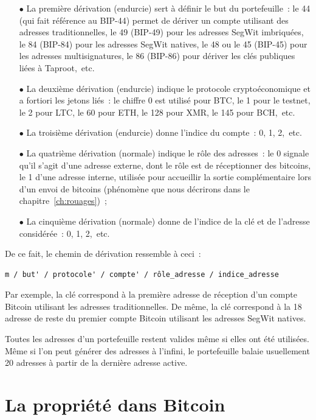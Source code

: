\begin{itemize}
  \item[$\bullet$] La première dérivation (endurcie) sert à définir le but du portefeuille~: le 44 (qui fait référence au BIP-44) permet de dériver un compte utilisant des adresses traditionnelles, le 49 (BIP-49) pour les adresses SegWit imbriquées, le 84 (BIP-84) pour les adresses SegWit natives, le 48 ou le 45 (BIP-45) pour les adresses multisignatures, le 86 (BIP-86) pour dériver les clés publiques liées à Taproot,~etc.
  \item[$\bullet$] La deuxième dérivation (endurcie) indique le protocole cryptoéconomique et a fortiori les jetons liés~: le chiffre 0 est utilisé pour BTC, le 1 pour le testnet, le 2 pour LTC, le 60 pour ETH, le 128 pour XMR, le 145 pour BCH,~etc.
  \item[$\bullet$] La troisième dérivation (endurcie) donne l'indice du compte~: 0, 1, 2,~etc.
  \item[$\bullet$] La quatrième dérivation (normale) indique le rôle des adresses~: le 0 signale qu'il s'agit d'une adresse externe, dont le rôle est de réceptionner des bitcoins, le 1 d'une adresse interne, utilisée pour accueillir la sortie complémentaire lors d'un envoi de bitcoins (phénomène que nous décrirons dans le chapitre~\ref{ch:rouages})~;
  \item[$\bullet$] La cinquième dérivation (normale) donne de l'indice de la clé et de l'adresse considérée~: 0, 1, 2,~etc.
\end{itemize}

De ce fait, le chemin de dérivation ressemble à ceci~:

\begin{Verbatim}[fontsize=\footnotesize]
m / but' / protocole' / compte' / rôle_adresse / indice_adresse
\end{Verbatim}

Par exemple, la clé  correspond à la première adresse de réception d'un compte Bitcoin utilisant les adresses traditionnelles. De même, la clé  correspond à la 18\ieme{} adresse de reste du premier compte Bitcoin utilisant les adresses SegWit natives.

Toutes les adresses d'un portefeuille restent valides même si elles ont été utilisées. Même si l'on peut générer des adresses à l'infini, le portefeuille balaie usuellement 20 adresses à partir de la dernière adresse active.

\section*{La propriété dans Bitcoin}

